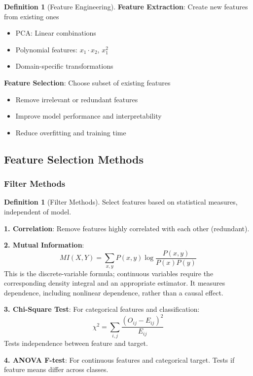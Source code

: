\documentclass[11pt,twoside]{article}
\numberwithin{equation}{section}
\theoremstyle{plain}
\theoremstyle{definition}
\newtheorem{definition}[theorem]{Definition}
\theoremstyle{remark}
\begin{document}
\begin{definition}[Feature Engineering]

\textbf{Feature Extraction}: Create new features from existing ones
\begin{itemize}
\item PCA: Linear combinations
\item Polynomial features: $x_1 \cdot x_2$, $x_1^2$
\item Domain-specific transformations
\end{itemize}

\textbf{Feature Selection}: Choose subset of existing features
\begin{itemize}
\item Remove irrelevant or redundant features
\item Improve model performance and interpretability
\item Reduce overfitting and training time
\end{itemize}
\end{definition}

\subsection{Feature Selection Methods}

\subsubsection{Filter Methods}

\begin{definition}[Filter Methods]
Select features based on statistical measures, independent of model.

\textbf{1. Correlation}:
Remove features highly correlated with each other (redundant).

\textbf{2. Mutual Information}:
\[
MI(X, Y) = \sum_{x,y} P(x,y) \log\frac{P(x,y)}{P(x)P(y)}
\]
This is the discrete-variable formula; continuous variables require the corresponding density integral and an appropriate estimator. It measures dependence, including nonlinear dependence, rather than a causal effect.

\textbf{3. Chi-Square Test}:
For categorical features and classification:
\[
\chi^2 = \sum_{i,j} \frac{(O_{ij} - E_{ij})^2}{E_{ij}}
\]
Tests independence between feature and target.

\textbf{4. ANOVA F-test}:
For continuous features and categorical target. Tests if feature means differ across classes.
\end{definition}
\end{document}
